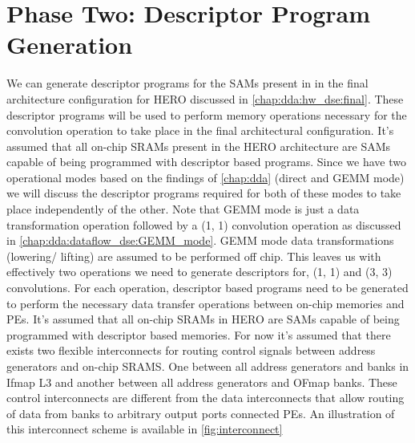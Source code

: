 
\clearpage

\section{Phase Two: Descriptor Program Generation}
\label{chap:net_compile:descriptor_generation}

We can generate descriptor programs for the SAMs present in
in the final architecture configuration for HERO discussed in \autoref{chap:dda:hw_dse:final}.
These descriptor programs will be used to perform memory operations necessary
for the convolution operation to take place in the final architectural configuration.
It's assumed that all on-chip SRAMs present in the HERO architecture are SAMs
capable of being programmed with descriptor based programs.   
Since we have two operational modes based on the findings of
\autoref{chap:dda} (direct and GEMM mode) we will discuss the
descriptor programs required for both of these modes to take place independently of
the other. Note that GEMM mode is just a data transformation operation
followed by a (1, 1) convolution operation as discussed in
\autoref{chap:dda:dataflow_dse:GEMM_mode}. GEMM mode data
transformations (lowering/ lifting) are assumed to be performed off chip. This leaves us
with effectively two operations we need to generate descriptors for, (1, 1) and (3, 3)
convolutions. For each operation, descriptor based programs need to be generated
to perform the necessary data transfer operations between on-chip memories and
PEs. It's assumed that all on-chip SRAMs in HERO are SAMs capable of being
programmed with descriptor based memories. 
For now it's assumed that there exists two flexible interconnects for routing
control signals between address generators and on-chip SRAMS. One between all
address generators and banks in Ifmap L3 and another between all address
generators and OFmap banks. These control interconnects are different from the
data interconnects that allow routing of data from banks to arbitrary output
ports connected PEs. An illustration of this interconnect scheme is available in
\autoref{fig:interconnect}

